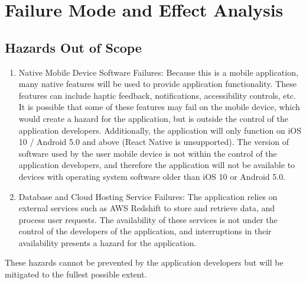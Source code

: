 \documentclass{article}
\begin{document}
	\section{Failure Mode and Effect Analysis}
	\subsection{Hazards Out of Scope}
	\begin{enumerate}
		\item Native Mobile Device Software Failures: Because this is a mobile application, many native features will be used to provide application functionality.
		These features can include haptic feedback, notifications, accessibility controls, etc. It is possible that some of these
		features may fail on the mobile device, which would create a hazard for the application, but is outside the control of the application developers. Additionally, the application
		will only function on iOS 10 / Android 5.0 and above (React Native is unsupported). The version of software used by the user mobile device is not within the control of the application developers, and therefore
		the application will not be available to devices with operating system software older than iOS 10 or Android 5.0.
		
		\item Database and Cloud Hosting Service Failures: The application relies on external services such as AWS Redshift to store and retrieve data, and process user requests.
		The availability of these services is not under the control of the developers of the application, and interruptions in their availability presents a hazard for the application.
	\end{enumerate}
	These hazards cannot be prevented by the application developers but will be mitigated to the fullest possible extent.
\end{document}
